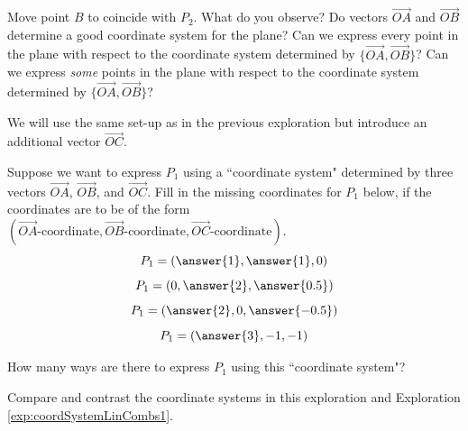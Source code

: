 \documentclass{ximera}
\begin{document}
\begin{exploration}

\begin{question}
    Move point $B$ to coincide with $P_2$.  What do you observe?  Do vectors $\overrightarrow{OA}$ and $\overrightarrow{OB}$ determine a good coordinate system for the plane?  Can we express every point in the plane with respect to the coordinate system determined by $\{\overrightarrow{OA}, \overrightarrow{OB}\}$?  Can we express \textit{some} points in the plane with respect to the coordinate system determined by $\{\overrightarrow{OA}, \overrightarrow{OB}\}$?
\end{question}

\end{exploration}

\begin{exploration}\label{exp:coordSystemLinCombs2}
We will use the same set-up as in the previous exploration but introduce an additional vector $\overrightarrow{OC}$.


 \begin{center}
 \end{center}

 \begin{question}
     Suppose we want to express $P_1$ using a ``coordinate system" determined by three vectors $\overrightarrow{OA}$, $\overrightarrow{OB}$, and $\overrightarrow{OC}$.  Fill in the missing coordinates for $P_1$ below, if the coordinates are to be of the form $(\overrightarrow{OA}\text{-coordinate}, \overrightarrow{OB}\text{-coordinate}, \overrightarrow{OC}\text{-coordinate})$.
     $$P_1=\left(\answer{1},\answer{1},0\right)$$
     $$P_1=\left(0,\answer{2},\answer{0.5}\right)$$
     $$P_1=\left(\answer{2}, 0, \answer{-0.5}\right)$$
     $$P_1=\left(\answer{3},-1,-1\right)$$

How many ways are there to express $P_1$ using this ``coordinate system"?
\begin{multipleChoice}
\end{multipleChoice}
 \end{question}


 \begin{question}
     Compare and contrast the coordinate systems in this exploration and Exploration \ref{exp:coordSystemLinCombs1}.  
 \end{question}
    
\end{exploration}
\end{document}
